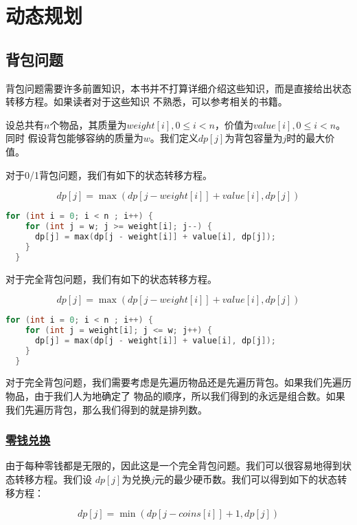 \documentclass[../../main.tex]{subfiles}
\begin{document}
\setchapterpreamble[u]{\margintoc}

\chapter{动态规划}

\section{背包问题}

背包问题需要许多前置知识，本书并不打算详细介绍这些知识，而是直接给出状态转移方程。如果读者对于这些知识
不熟悉，可以参考相关的书籍。

设总共有$n$个物品，其质量为$weight[i], 0 \leq i < n$，价值为$value[i], 0 \leq i < n$。同时
假设背包能够容纳的质量为$w$。我们定义$dp[j]$为背包容量为$j$时的最大价值。

对于0/1背包问题，我们有如下的状态转移方程。

$$
dp[j] = \max(dp[j - weight[i]] + value[i], dp[j])
$$

\begin{lstlisting}[language=C++]
  for (int i = 0; i < n ; i++) {
    for (int j = w; j >= weight[i]; j--) {
      dp[j] = max(dp[j - weight[i]] + value[i], dp[j]);
    }
  }
\end{lstlisting}


对于完全背包问题，我们有如下的状态转移方程。

$$
dp[j] = \max(dp[j - weight[i]] + value[i], dp[j])
$$

\begin{lstlisting}[language=C++]
  for (int i = 0; i < n ; i++) {
    for (int j = weight[i]; j <= w; j++) {
      dp[j] = max(dp[j - weight[i]] + value[i], dp[j]);
    }
  }
\end{lstlisting}

对于完全背包问题，我们需要考虑是先遍历物品还是先遍历背包。如果我们先遍历物品，由于我们人为地确定了
物品的顺序，所以我们得到的永远是组合数。如果我们先遍历背包，那么我们得到的就是排列数。

\subsection{\href{https://leetcode.cn/problems/coin-change/}{零钱兑换}}

由于每种零钱都是无限的，因此这是一个完全背包问题。我们可以很容易地得到状态转移方程。我们设
$dp[j]$为兑换$j$元的最少硬币数。我们可以得到如下的状态转移方程：

$$
dp[j] = \min(dp[j - coins[i]] + 1, dp[j])
$$
\end{document}
